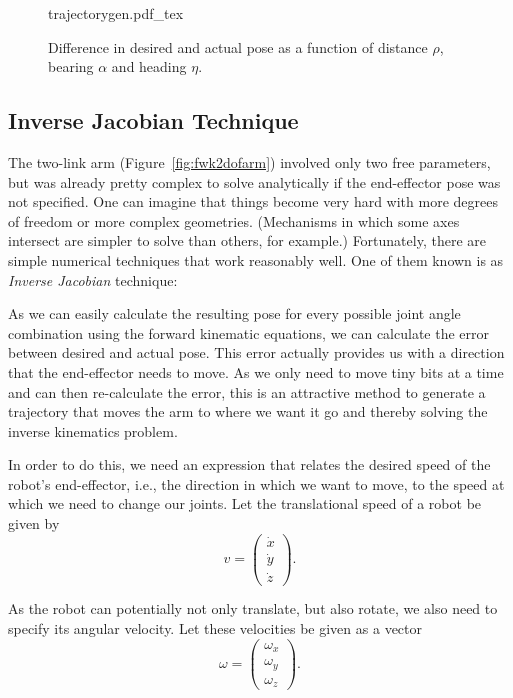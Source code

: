 \begin{figure}
    \centering
    \def\svgwidth{\textwidth}
    {trajectorygen.pdf_tex}
    \caption{Difference in desired and actual pose as a function of distance $\rho$, bearing $\alpha$ and heading $\eta$.}
    \label{fig:trajectorygen}
\end{figure}


\subsection{Inverse Jacobian Technique}\label{sec:invjac}

The two-link arm (Figure~\ref{fig:fwk2dofarm}) involved only two free parameters, but was already pretty complex to solve analytically if the end-effector pose was not specified. One can imagine that things become very hard with more degrees of freedom or more complex geometries. (Mechanisms in which some axes intersect are simpler to solve than others, for example.) Fortunately, there are simple numerical techniques that work reasonably well. One of them known is as \emph{Inverse Jacobian} technique:

As we can easily calculate the resulting pose for every possible joint angle combination using the forward kinematic equations, we can calculate the error between desired and actual pose. This error actually provides us with a direction that the end-effector needs to move. As we only need to move tiny bits at a time and can then re-calculate the error, this is an attractive method to generate a trajectory that moves the arm to where we want it go and thereby solving the inverse kinematics problem.

In order to do this, we need an expression that relates the desired speed of the robot's end-effector, i.e., the direction in which we want to move, to the speed at which we need to change our joints. Let the translational speed of a robot be given by
\begin{equation}
v=\left(\begin{array}{c}
\dot{x}\\
\dot{y}\\
\dot{z}
\end{array}
\right).
\end{equation}

 As the robot can potentially not only translate, but also rotate, we also need to specify its angular velocity. Let these velocities be given as a vector
\begin{equation}
\omega=\left(\begin{array}{c}
\omega_x\\
\omega_y\\
\omega_z
\end{array}
\right).
\end{equation}

